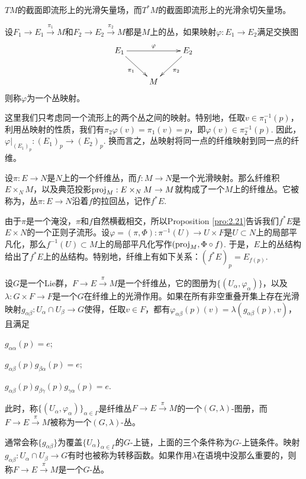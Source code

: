 $TM$的截面即流形上的光滑矢量场，而$T^*M$的截面即流形上的光滑余切矢量场。

\begin{para}[丛映射]
设$F_1\to E_1\xrightarrow{\pi_1} M$和$F_2\to E_2\xrightarrow{\pi_2} M$都是$M$上的丛，如果映射$\varphi:E_1\to E_2$满足交换图
\[
	\xymatrix{
	E_1\ar[rr]^\varphi\ar[rd]_{\pi_1}&&E_2\ar[ld]^{\pi_2}\\
	&M&
	}
\]
则称$\varphi$为一个丛映射。
\end{para}

这里我们只考虑同一个流形上的两个丛之间的映射。特别地，任取$v\in \pi_1^{-1}(p)$，利用丛映射的性质，我们有$\pi_2\varphi(v)=\pi_1(v)=p$，即$\varphi(v)\in \pi_2^{-1}(p)$. 因此，$\varphi|_{(E_1)_p}:(E_1)_p\to (E_2)_p$. 换而言之，丛映射将同一点的纤维映射到同一点的纤维。

\begin{para}[拉回丛]
设$\pi:E\to N$是$N$上的一个纤维丛，而$f:M\to N$是一个光滑映射。那么纤维积$E\times_N M$，以及典范投影$\operatorname{proj}_M:E\times_N M\to M$就构成了一个$M$上的纤维丛。它被称为，丛$\pi:E\to N$沿着$f$的拉回丛，记作$f^*E$.
\end{para}

由于$\pi$是一个淹没，$\pi$和$f$自然横截相交，所以Proposition \ref{pro:2.21}告诉我们$f^*E$是$E\times N$的一个正则子流形。设$\varphi=(\pi,\Phi):\pi^{-1}(U)\to U\times F$是$U\subset N$上的局部平凡化，那么$f^{-1}(U)\subset M$上的局部平凡化写作$(\operatorname{proj}_M,\Phi\circ f)$. 于是，$E$上的丛结构给出了$f^*E$上的丛结构。特别地，纤维上有如下关系：$(f^*E)_{p}=E_{f(p)}$.

\begin{para}[$G$-丛]
设$G$是一个Lie群，$F\to E\xrightarrow{\pi} M$是一个纤维丛，它的图册为$\{(U_\alpha,\varphi_\alpha)\}$，以及$\lambda:G\times F\to F$是一个$G$在纤维上的光滑作用。如果在所有非空重叠开集上存在光滑映射$g_{\alpha\beta}:U_\alpha\cap U_\beta\to G$使得，任取$v\in F$，都有$\varphi_{\alpha\beta}(p)(v)=\lambda(g_{\alpha\beta}(p),v)$，且满足
\begin{compactenum}[~~~(1)]
	\item $g_{\alpha\alpha}(p)=e$;
	\item $g_{\alpha\beta}(p) g_{\beta\alpha}(p)=e$;
	\item $g_{\alpha\beta}(p) g_{\beta\gamma}(p) g_{\gamma\alpha}(p)=e$.
\end{compactenum}
此时，称$\{(U_\alpha,\varphi_\alpha)\}_{\alpha\in \Gamma}$是纤维丛$F\to E\xrightarrow{\pi} M$的一个$(G,\lambda)$-图册，而$F\to E\xrightarrow{\pi} M$被称为一个$(G,\lambda)$-丛。

通常会称$\{g_{\alpha\beta}\}$为覆盖$\{U_\alpha\}_{\alpha\in \Gamma}$的$G$-上链，上面的三个条件称为$G$-上链条件。映射$g_{\alpha\beta}:U_\alpha\cap U_\beta\to G$有时也被称为转移函数。如果作用$\lambda$在语境中没那么重要的，则称$F\to E\xrightarrow{\pi} M$是一个$G$-丛。
\end{para}

